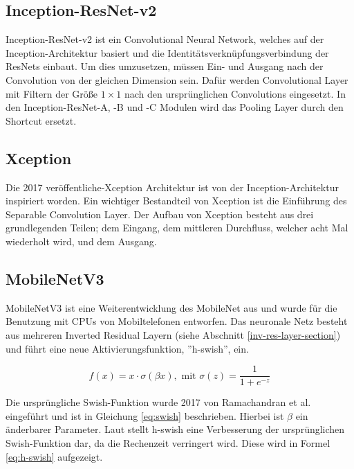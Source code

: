 \subsection{Inception-ResNet-v2}
Inception-ResNet-v2 ist ein Convolutional Neural Network, welches auf der Inception-Architektur basiert und die Identitätsverknüpfungsverbindung der ResNets einbaut. Um dies umzusetzen, müssen Ein- und Ausgang nach der Convolution von der gleichen Dimension sein. Dafür werden Convolutional Layer mit Filtern der Größe $1\times1$ nach den ursprünglichen Convolutions eingesetzt. In den Inception-ResNet-A, -B und -C Modulen wird das Pooling Layer durch den Shortcut ersetzt. \cite{inception-inceptionresnet-and-the-impact-of-residual-connections-on-learning}


\subsection{Xception}
Die 2017 veröffentliche-Xception Architektur ist von der Inception-Architektur \cite{rethinking-inception-for-computer-vision} inspiriert worden. Ein wichtiger Bestandteil von Xception ist die Einführung des Separable Convolution Layer. Der Aufbau von Xception besteht aus drei grundlegenden Teilen; dem Eingang, dem mittleren Durchfluss, welcher acht Mal wiederholt wird, und dem Ausgang. \cite{xception-dl-with-depthwise-sep-conv}


\subsection{MobileNetV3}
MobileNetV3 ist eine Weiterentwicklung des MobileNet aus \cite{mobilenets} und wurde für die Benutzung mit CPUs von Mobiltelefonen entworfen. Das neuronale Netz besteht aus mehreren Inverted Residual Layern (siehe Abschnitt \ref{inv-res-layer-section})  und führt eine neue Aktivierungsfunktion, ''h-swish'', ein. \cite{searching-for-mobilenetv3}

\begin{equation}\label{eq:swish}
f(x)=x \cdot \sigma(\beta x), \text{         mit } \sigma(z)= \frac{1}{1+e^{-z}}
\end{equation}

\mypar Die ursprüngliche Swish-Funktion wurde 2017 von Ramachandran et al. \cite{searching-for-act-functions} eingeführt und ist in Gleichung \ref{eq:swish} beschrieben. Hierbei ist $\beta$ ein änderbarer Parameter. Laut \cite{searching-for-mobilenetv3} stellt h-swish eine Verbesserung der ursprünglichen Swish-Funktion dar, da die Rechenzeit verringert wird. Diese wird in Formel \ref{eq:h-swish} aufgezeigt.

